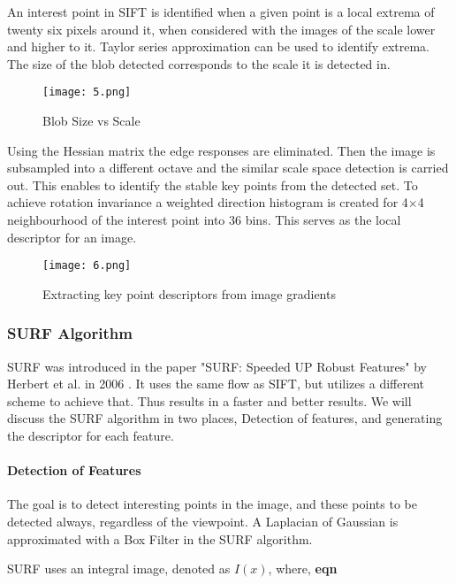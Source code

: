 An interest point in SIFT is identified when a given point is a local extrema of twenty six pixels around it, when considered with the images of the scale lower and higher to it. Taylor series approximation can be used to identify extrema. The size of the blob detected corresponds to the scale it is detected in.

\begin{figure}[htbp]
\sidecaption
\texttt{[image: 5.png]}
\caption{Blob Size vs Scale}
\label{Fig_2_blob_scale}       %
\end{figure}

Using the Hessian matrix the edge responses are eliminated. Then the image is subsampled into a different octave and the similar scale space detection is carried out. This enables to identify the stable key points from the detected set. To achieve rotation invariance a weighted direction histogram is created for 4$\times$4 neighbourhood of the interest point into 36 bins. This serves as the local descriptor for an image.

\begin{figure}[htbp]
\sidecaption
\texttt{[image: 6.png]}
\caption{Extracting key point descriptors from image gradients}
\label{Fig_2_key_point}       %
\end{figure}

\subsubsection{SURF Algorithm}
SURF was introduced in the paper "SURF: Speeded UP Robust Features" by Herbert et al. in 2006 \cite{Bay2006}. It uses the same flow as SIFT, but utilizes a different scheme to achieve that. Thus results in a faster and better results. We will discuss the SURF algorithm in two places, Detection of features, and generating the descriptor for each feature.

\paragraph*{\textbf{Detection of Features}}
The goal is to detect interesting points in the image, and these points to be detected always, regardless of the viewpoint. A Laplacian \cite{Mikolajczyk2001} of Gaussian is approximated with a Box Filter in the SURF algorithm.

SURF uses an integral image, denoted as $I(x)$, where,
\textbf{eqn}

